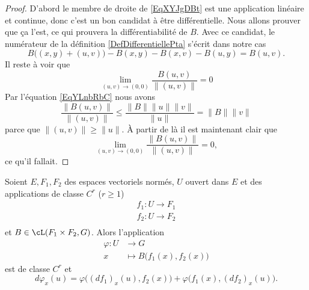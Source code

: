 \begin{proof}
	D'abord le membre de droite de \eqref{EqXYJgDBt} est une application linéaire et continue, donc c'est un bon candidat à être différentielle. Nous allons prouver que ça l'est, ce qui prouvera la différentiabilité de \( B\). Avec ce candidat, le numérateur de la définition \eqref{DefDifferentiellePta} s'écrit dans notre cas
	\begin{equation}
		B\big( (x,y)+(u,v) \big)-B(x,y)-B(x,v)-B(u,y)=B(u,v).
	\end{equation}
	Il reste à voir que
	\begin{equation}
		\lim_{ (u,v)\to (0,0) } \frac{ B(u,v) }{ \| (u,v) \| }=0
	\end{equation}
	Par l'équation \eqref{EqYLnbRbC} nous avons
	\begin{equation}
		\frac{ \| B(u,v) \| }{ \| (u,v) \| }\leq \frac{ \| B \|\| u \|\| v \| }{ \| u \| }=\| B \|\| v \|
	\end{equation}
	parce que \( \| (u,v) \|\geq \| u \|\). À partir de là il est maintenant clair que
	\begin{equation}
		\lim_{(u,v)\to (0,0)}\frac{ \| B(u,v) \| }{ \| (u,v) \| }=0,
	\end{equation}
	ce qu'il fallait.
\end{proof}

\begin{proposition}
	Soient \( E,F_1,F_2\) des espaces vectoriels normés, \( U\) ouvert dans \( E\) et des applications de classe \( C^r\) (\( r\geq 1\))
	\begin{subequations}
		\begin{align}
			f_1\colon U\to F_1 \\
			f_2\colon U\to F_2 \\
		\end{align}
	\end{subequations}
	et \( B\in\cL(F_1\times F_2,G)\). Alors l'application
	\begin{equation}
		\begin{aligned}
			\varphi\colon U & \to G                              \\
			x               & \mapsto B\big( f_1(x),f_2(x) \big)
		\end{aligned}
	\end{equation}
	est de classe \( C^r\) et
	\begin{equation}    \label{EqMNGBXWc}
		d\varphi_x(u)=\varphi\big( (df_1)_x(u),f_2(x) \big)+\varphi\big( f_1(x),(df_2)_x(u) \big).
	\end{equation}
\end{proposition}

